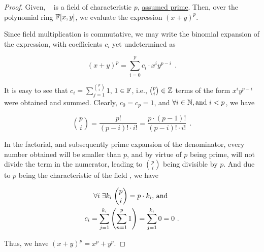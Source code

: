 \question

\begin{proof}

Given, \field~ is a field of characteristic $p$, \underline{assumed prime}. Then,
over the polynomial ring $\mathbb{F}[x, y]$, we evaluate the expression \((x+y)^p\).

Since field multiplication is commutative, we may write the binomial expansion
of the expression, with coefficients \(c_i\) yet undetermined as

\begin{equation}
    (x+y)^p = \sum_{i = 0}^{p} c_i \cdot x^iy^{p-i}~~.
\end{equation}

It is easy to see that \(c_i = \sum_{j = 1}^{\binom{p}{i}} 1\), \(1 \in
\mathbb{F}\), i.e., \(\binom{p}{i}\in\mathbb{Z}\) terms of the form \(x^iy^{p-i}\)
were obtained and summed. Clearly, \(c_0 = c_p = 1\), and \(\forall i \in
\mathbb{N}, \textnormal{and } i < p\), we have

\begin{equation}
    \binom{p}{i} = \frac{p!}{(p-i)!\cdot i!} = \frac{p\cdot (p-1)!}{(p-i)!\cdot i!}~~.
\end{equation}

In the factorial, and subsequently prime expansion of the denominator, every
number obtained will be smaller than \(p\), and by virtue of \(p\) being prime,
will not divide the term in the numerator, leading to \(\binom{p}{i}\) being
divisible by \(p\). And due to \(p\) being the characteristic of the field
\field, we have

\begin{gather}
    \forall i\;\exists k_i\; \binom{p}{i} = p\cdot k_i \textnormal{, and } \\
    c_i = \sum_{j = 1}^{k_i} \left( \sum_{n = 1}^{p} 1 \right) = \sum_{j = 1}^{k_i} 0 = 0~.
\end{gather}

Thus, we have \((x+y)^p = x^p + y^p\).

\end{proof}